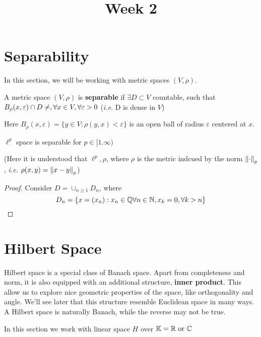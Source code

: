 \documentclass{article}
\title{Week 2}
\begin{document}
\maketitle


\section{Separability}  

In this section, we will be working with metric spaces \((V, \rho)\).

\begin{definition}[Separable]
	A metric space $(V,\rho)$ is \textbf{separable} if \(\exists D \subset V\) countable, 
	such that \(B_{\rho}(x, \varepsilon) \cap D \neq \empty, \forall x \in V, \forall \varepsilon >0\) 
	(\textit{i.e.} D is dense in \(V\))
\end{definition}

Here \(B_{\rho}(x, \varepsilon)=\{y \in V: \rho (y,x) < \varepsilon\}\) is an open ball of radius \(\varepsilon\) 
centered at \(x\).

\begin{proposition}
	\(\ell^p\) space is separable for \(p \in [1. \infty)\)
\end{proposition}  
(Here it is understood that \(\ell^p, \rho\), where \(\rho\) is the metric indcued by the norm \(\left\|{\cdot}\right\|_p\), 
\textit{i.e.} \(\rho(x,y)=\left\|{x-y}\right\|_p\))  

\begin{proof}
	Consider \(D = \cup_{n\geq 1} D_n\), where  
	\[ D_n = \{x=(x_n): x_n \in \mathbb{Q} \forall n \in \mathbb{N}, x_k=0, \forall k >n\}\]
\end{proof}


\newpage
\section{Hilbert Space}  

\begin{unexaminable}
Hilbert space is a special class of Banach space. 
Apart from completeness and norm, it is also equipped with an additional structure, 
{\bf inner product}. This allow us to explore nice geometric properties of the space, 
like orthogonality and angle. We'll see later that this structure resemble Euclidean space in many ways. A Hilbert space is naturally Banach, while the reverse may not be true.
\end{unexaminable}

In this section we work with linear space $H$ over $\mathbb{K} = \real \ \textrm{or} \ \mathbb{ C}$
\end{document}
